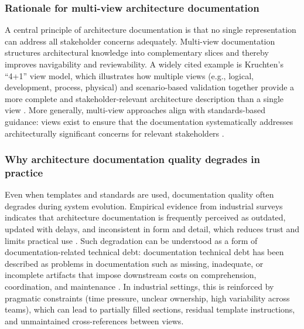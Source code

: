 \subsubsection{Rationale for multi-view architecture documentation}
A central principle of architecture documentation is that no single representation can address all stakeholder concerns adequately. Multi-view documentation structures architectural knowledge into complementary slices and thereby improves navigability and reviewability. A widely cited example is Kruchten’s ``4+1'' view model, which illustrates how multiple views (e.g., logical, development, process, physical) and scenario-based validation together provide a more complete and stakeholder-relevant architecture description than a single view \cite{kruchten_4plus1}. More generally, multi-view approaches align with standards-based guidance: views exist to ensure that the documentation systematically addresses architecturally significant concerns for relevant stakeholders \cite{iso42010}.

\subsubsection{Why architecture documentation quality degrades in practice}
Even when templates and standards are used, documentation quality often degrades during system evolution. Empirical evidence from industrial surveys indicates that architecture documentation is frequently perceived as outdated, updated with delays, and inconsistent in form and detail, which reduces trust and limits practical use \cite{naab_sad_survey}. Such degradation can be understood as a form of documentation-related technical debt: documentation technical debt has been described as problems in documentation such as missing, inadequate, or incomplete artifacts that impose downstream costs on comprehension, coordination, and maintenance \cite{mendes_doc_td}. In industrial settings, this is reinforced by pragmatic constraints (time pressure, unclear ownership, high variability across teams), which can lead to partially filled sections, residual template instructions, and unmaintained cross-references between views.


